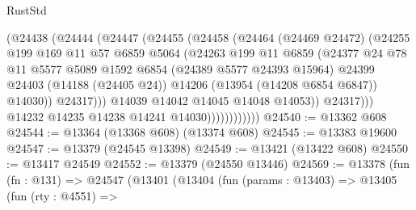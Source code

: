 \begin{lexlean}{RustStd}
\begin{coremodule}
                              (@24438
                                (@24444
                                  (@24447
                                    (@24455
                                      (@24458
                                        (@24464
                                          (@24469 @24472)
                                          (@24255
                                            @199
                                            @169
                                            @11
                                            @57
                                            @6859
                                            @5064
                                            (@24263
                                              @199
                                              @11
                                              @6859
                                              (@24377
                                                @24
                                                @78
                                                @11
                                                @5577
                                                @5089
                                                @1592
                                                @6854
                                                (@24389 @5577 @24393 @15964)
                                                @24399
                                                @24403
                                                (@14188 (@24405 @24))
                                                @14206
                                                (@13954 (@14208 @6854 @6847))
                                                @14030))
                                            @24317)))
                                      @14039
                                      @14042
                                      @14045
                                      @14048
                                      @14053))
                                  @24317)))
                            @14232
                            @14235
                            @14238
                            @14241
                            @14030))))))))))))
@24540 := @13362 @608
@24544 := @13364 (@13368 @608) (@13374 @608)
@24545 := @13383 @19600
@24547 := @13379 (@24545 @13398)
@24549 := @13421 (@13422 @608)
@24550 := @13417 @24549
@24552 := @13379 (@24550 @13446)
@24569 := @13378
    (fun (fn : @131) =>
    @24547
      (@13401
        (@13404
          (fun (params : @13403) =>
          @13405
            (fun (rty : @4551) =>

\end{coremodule}
\end{lexlean}

